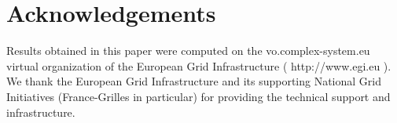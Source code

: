 \section*{Acknowledgements}

Results obtained in this paper were computed on the vo.complex-system.eu virtual organization of the European Grid Infrastructure ( http://www.egi.eu ). We thank the European Grid Infrastructure and its supporting National Grid Initiatives (France-Grilles in particular) for providing the technical support and infrastructure.






\footnotesize

\begin{multicols}{2}


\end{multicols}






